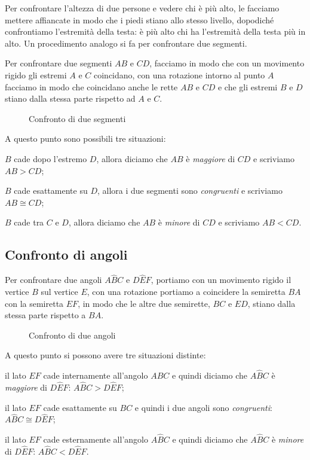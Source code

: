 Per confrontare l'altezza di due persone e vedere chi è più alto, le facciamo mettere affiancate in modo che i piedi stiano allo stesso livello, dopodiché confrontiamo l'estremità della testa: è più alto chi ha l'estremità della testa più in alto. Un procedimento analogo si fa per confrontare due segmenti.

Per confrontare due segmenti $AB$ e $CD$, facciamo in modo che con un movimento rigido gli estremi $A$ e $C$ coincidano, con una rotazione intorno al punto $A$ facciamo in  modo che coincidano anche le rette $AB$ e $CD$ e che gli estremi $B$ e $D$ stiano dalla stessa parte rispetto ad $A$ e $C$.

\begin{figure}[htb]
\centering
\caption{Confronto di due segmenti}
\end{figure}

A questo punto sono possibili tre situazioni:
\begin{itemize*}
\item $B$ cade dopo l'estremo $D$, allora diciamo che $AB$ è \emph{maggiore} di $CD$ e scriviamo $AB>CD$;
\item $B$ cade esattamente su $D$, allora i due segmenti sono \emph{congruenti} e scriviamo $AB\cong CD$;
\item $B$ cade tra $C$ e $D$, allora diciamo che $AB$ è \emph{minore} di $CD$ e scriviamo $AB<CD$.
\end{itemize*}

\subsection{Confronto di angoli}

Per confrontare due angoli $A\widehat{B}C$ e $D\widehat{E}F$, portiamo con un movimento rigido il vertice $B$ sul vertice $E$, con una rotazione portiamo a coincidere la semiretta $BA$ con la semiretta $EF$, in modo che le altre due semirette, $BC$ e $ED$, stiano dalla stessa parte rispetto a $BA$.

\begin{figure}[htb]
\centering
\caption{Confronto di due angoli}
\end{figure}

A questo punto si possono avere tre situazioni distinte:
\begin{itemize*}
\item il lato $EF$ cade internamente all'angolo $A\widehat{B}C$ e quindi diciamo che $A\widehat{B}C$ è \emph{maggiore} di $D\widehat{E}F$: $A\widehat{B}C>D\widehat{E}F$;
\item il lato $EF$ cade esattamente su $BC$ e quindi i due angoli sono \emph{congruenti}: $A\widehat{B}C\cong D\widehat{E}F$;
\item il lato $EF$ cade esternamente all'angolo $A\widehat{B}C$ e quindi diciamo che $A\widehat{B}C$ è \emph{minore} di $D\widehat{E}F$: $A\widehat{B}C<D\widehat{E}F$.
\end{itemize*}

